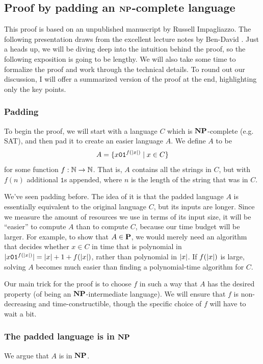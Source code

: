 \documentclass[11pt,twoside=off,numbers=noenddot]{scrbook}
\begin{document}
\subsection{Proof by padding an $\textbf{NP}$-complete language}
This proof is based on an unpublished manuscript by Russell Impagliazzo. The following presentation draws from the excellent lecture notes by Ben-David \cite{ben2021np}. Just a heads up, we will be diving deep into the intuition behind the proof, so the following exposition is going to be lengthy. We will also take some time to formalize the proof and work through the technical details. To round out our discussion, I will offer a summarized version of the proof at the end, highlighting only the key points.

\subsubsection{Padding}
To begin the proof, we will start with a language $C$ which is $\textbf{NP}$-complete (e.g. SAT), and then pad it to create an easier language $A$. We define $A$ to be
\[ A = \{ x\texttt{0}\texttt{1}^{f(| x |)} \mid x \in C \} \]
for some function $f : \mathbb N \to \mathbb N$. That is, $A$ contains all the strings in $C$, but with $f(n)$ additional $\texttt{1}$s appended, where $n$ is the length of the string that was in $C$.

We've seen padding before. The idea of it is that the padded language $A$ is essentially equivalent to the original language $C$, but its inputs are longer. Since we measure the amount of resources we use in terms of its input size, it will be ``easier'' to compute $A$ than to compute $C$, because our time budget will be larger. For example, to show that $A \in \textbf{P}$, we would merely need an algorithm that decides whether $x \in C$ in time that is polynomial in $| x\texttt{0}\texttt{1}^{f(| x |)} | = | x | + 1 + f(| x |)$, rather than polynomial in $| x |$. If $f(| x |)$ is large, solving $A$ becomes much easier than finding a polynomial-time algorithm for $C$.

Our main trick for the proof is to choose $f$ in such a way that $A$ has the desired property (of being an $\textbf{NP}$-intermediate language). We will ensure that $f$ is non-decreasing and time-constructible, though the specific choice of $f$ will have to wait a bit.

\subsubsection{The padded language is in $\textbf{NP}$}
We argue that $A$ is in $\textbf{NP}$.
\end{document}
